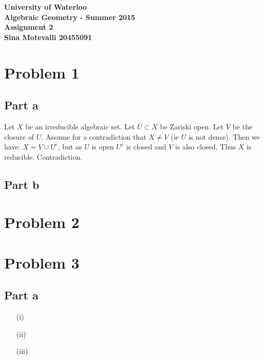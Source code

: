 \documentclass[12pt]{article}
\begin{document}
\begin{center}
  {\Large\bf University of Waterloo}\\
  \vspace{3mm}
         {\Large\bf Algebraic Geometry - Summer 2015}\\
         \vspace{2mm}
                {\Large\bf Assignment 2}\\
                \vspace{3mm}
                \textbf{Sina Motevalli 20455091}
\end{center}
\section*{Problem 1}
\subsection*{Part a}
Let $X$ be an irreducible algebraic set. Let $U \subset X$ be Zariski open. Let $V$ be the closure of $U$. Assume for a contradiction that $X \not= V$ (ie $U$ is not dense). Then we have: $X=V \cup U^c $, but as $U$ is open $U^c$ is closed and $V$ is also closed, Thus $X$ is reducible. Contradiction.
\subsection*{Part b}
\section*{Problem 2}
\section*{Problem 3}
\subsection{Part a}
\begin{enumerate}
\item[(i)]
\item[(ii)]
\item[(iii)]
\end{enumerate}
\end{document}
